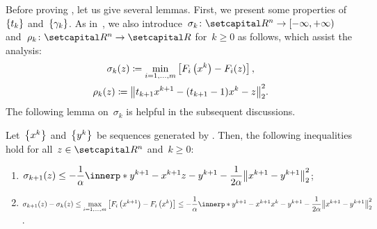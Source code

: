 \documentclass[../main]{subfiles}
\begin{document}
Before proving , let us give several lemmas.
First, we present some properties of~$\set{t_k}$ and~$\set{\gamma_k}$.
As in~\cite{Tanabe2022a}, we also introduce~$\sigma_k \colon \setR^n \to [-\infty, +\infty)$ and~$\rho_k \colon \setR^n \to \setR$ for~$k \ge 0$ as follows, which assist the analysis:
\begin{equation} \label{eq:sigma rho}
\begin{gathered} 
    \sigma_k(z) \coloneqq \min_{i = 1, \dots, m} \left[ F_i\left(x^k\right) - F_i(z) \right], \\
        \rho_k(z) \coloneqq \norm*{t_{k + 1} x^{k + 1} - (t_{k + 1} - 1) x^k - z}_2^2
.\end{gathered}
\end{equation}
The following lemma on~$\sigma_k$ is helpful in the subsequent discussions.
\begin{lemma} 
    Let~$\set*{x^k}$ and~$\set*{y^k}$ be sequences generated by .
    Then, the following inequalities hold for all~$z \in \setR^n$ and~$k \ge 0$:
    \begin{enumerate}
        \item {} $\displaystyle \sigma_{k + 1}(z) \le - \frac{1}{\alpha} \innerp*{y^{k + 1} - x^{k + 1}}{z - y^{k + 1}} - \frac{1}{2 \alpha} \norm*{x^{k + 1} - y^{k + 1}}_2^2$;
        \item {} $\displaystyle \sigma_{k + 1}(z) - \sigma_k(z) \le \max_{i = 1, \dots, m} \left[ F_i\left(x^{k + 1}\right) - F_i\left( x^k \right) \right] \le - \frac{1}{\alpha} \innerp*{y^{k + 1} - x^{k + 1}}{x^k - y^{k + 1}} - \frac{1}{2 \alpha} \norm*{x^{k + 1} - y^{k + 1}}_2^2$.
    \end{enumerate}
\end{lemma}
\end{document}

